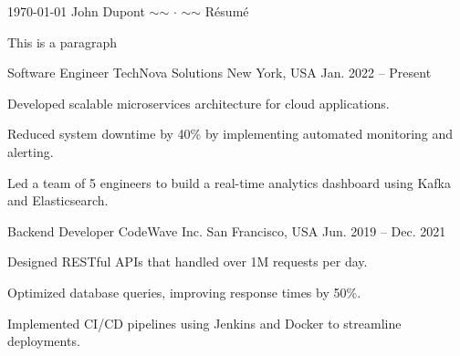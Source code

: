 \documentclass[11pt, a4paper]{awesome-cv}
\begin{document}
\makecvheader[C]

\makecvfooter
  {\today}
  {John Dupont $\sim$$\sim$ $\cdot$ $\sim$$\sim$ Résumé}
  {\thepage}




\begin{cvparagraph}
This is a paragraph
\end{cvparagraph}


\cventry
   {Software Engineer} %
   {TechNova Solutions} %
   {New York, USA} %
   {Jan. 2022 -- Present} %
   {
     \begin{cvitems} %
     	\item Developed scalable microservices architecture for cloud applications.
		\item Reduced system downtime by 40\% by implementing automated monitoring and alerting.
		\item Led a team of 5 engineers to build a real-time analytics dashboard using Kafka and Elasticsearch.
     \end{cvitems}
   }
\cventry
   {Backend Developer} %
   {CodeWave Inc.} %
   {San Francisco, USA} %
   {Jun. 2019 -- Dec. 2021} %
   {
     \begin{cvitems} %
     	\item Designed RESTful APIs that handled over 1M requests per day.
		\item Optimized database queries, improving response times by 50\%.
		\item Implemented CI/CD pipelines using Jenkins and Docker to streamline deployments.
     \end{cvitems}
   }
\end{document}
